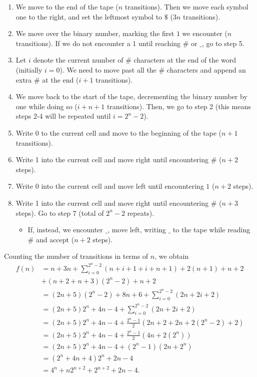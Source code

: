 \begin{enumerate}
    \item We move to the end of the tape ($n$ transitions). Then we move each symbol one to the right, and set the leftmost symbol to $\$$ ($3n$ transitions).
    \item We move over the binary number, marking the first $1$ we encounter ($n$ transitions). If we do not encounter a 1 until reaching $\#$ or $\_$, go to step 5.
    \item Let $i$ denote the current number of $\#$ characters at the end of the word (initially $i=0$). We need to move past all the $\#$ characters and append an extra $\#$ at the end ($i+1$ transitions).
    \item We move back to the start of the tape, decrementing the binary number by one while doing so ($i+n+1$ transitions). Then, we go to step 2 (this means steps 2-4 will be repeated until $i=2^n-2$).
    \item Write 0 to the current cell and move to the beginning of the tape ($n+1$ transitions).
    \item Write 1 into the current cell and move right until encountering $\#$ ($n+2$ steps).
    \item Write 0 into the current cell and move left until encountering $1$ ($n+2$ steps).
    \item Write 1 into the current cell and move right until encountering $\#$ ($n+3$ steps). Go to step 7 (total of $2^n-2$ repeats). 
    \begin{itemize}
        \item If, instead, we encounter $\_$, move left, writing $\_$ to the tape while reading $\#$ and accept ($n+2$ steps).
    \end{itemize}
\end{enumerate}

Counting the number of transitions in terms of $n$, we obtain
\begin{align*}
    f(n) &=
        n + 3n +
        \sum_{i=0}^{2^n-2}(n + i + 1 + i + n + 1) +
        2(n + 1) + n + 2 \\ &+
        (n + 2 + n + 3)(2^n - 2) + 
        n + 2 \\
    &= (2n + 5)(2^n - 2) + 8n + 6 + \sum_{i=0}^{2^n-2}(2n + 2i + 2) \\
    &= (2n + 5) 2^n + 4n - 4 + \sum_{i=0}^{2^n-2}(2n + 2i + 2) \\
    &= (2n + 5) 2^n + 4n - 4 + \frac{2^n - 1}{2}(2n+2+2n+2(2^n-2) + 2) \\
    &= (2n + 5) 2^n + 4n - 4 + \frac{2^n - 1}{2}(4n + 2(2^n)) \\
    &= (2n + 5) 2^n + 4n - 4 + (2^n - 1)(2n + 2^n) \\
    &= (2^n + 4n + 4) 2^n + 2n - 4 \\
    &= 4^n + n 2^{n+2} + 2^{n+2} + 2n - 4.
\end{align*}

